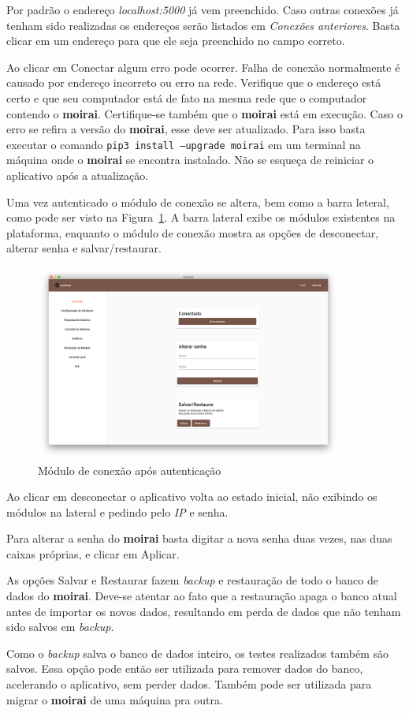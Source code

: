 Por padrão o endereço \textit{localhost:5000} já vem preenchido. Caso outras
conexões já tenham sido realizadas os endereços serão listados em
\textit{Conexões anteriores}. Basta clicar em um endereço para que ele seja
preenchido no campo correto.

Ao clicar em Conectar algum erro pode ocorrer. Falha de conexão normalmente é
causado por endereço incorreto ou erro na rede. Verifique que o endereço está
certo e que seu computador está de fato na mesma rede que o computador contendo
o \textbf{moirai}. Certifique-se também que o \textbf{moirai} está em execução.
Caso o erro se refira a versão do \textbf{moirai}, esse deve ser atualizado.
Para isso basta executar o comando \texttt{pip3 install --upgrade
moirai} em um terminal na máquina onde o \textbf{moirai} se encontra instalado.
Não se esqueça de reiniciar o aplicativo após a atualização.

Uma vez autenticado o módulo de conexão se altera, bem como a barra leteral,
como pode ser visto na Figura~\ref{fig:connection-screen}. A barra lateral exibe
os módulos existentes na plataforma, enquanto o módulo de conexão mostra as
opções de desconectar, alterar senha e salvar/restaurar.

\begin{figure}[ht!]
    \centering
    \includegraphics[width=0.9\textwidth]{imgs/connection-screen}
    \caption[Módulo de conexão após autenticação]{Módulo de conexão após autenticação}%
    \label{fig:connection-screen}
\end{figure}

Ao clicar em desconectar o aplicativo volta ao estado inicial, não exibindo os
módulos na lateral e pedindo pelo \textit{IP} e senha.

Para alterar a senha do \textbf{moirai} basta digitar a nova senha duas vezes,
nas duas caixas próprias, e clicar em Aplicar.

As opções Salvar e Restaurar fazem \textit{backup} e restauração de todo o banco
de dados do \textbf{moirai}. Deve-se atentar ao fato que a restauração apaga o
banco atual antes de importar os novos dados, resultando em perda de dados que
não tenham sido salvos em \textit{backup}.

Como o \textit{backup} salva o banco de dados inteiro, os testes realizados
também são salvos. Essa opção pode então ser utilizada para remover dados do
banco, acelerando o aplicativo, sem perder dados. Também pode ser utilizada para
migrar o \textbf{moirai} de uma máquina pra outra.
